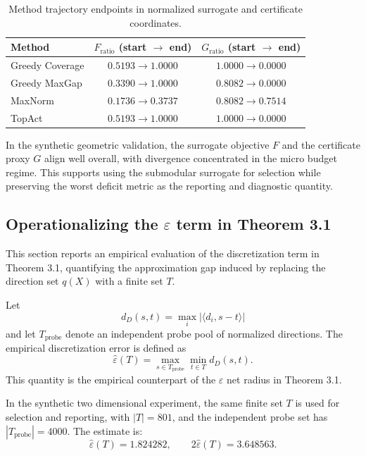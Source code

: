 \documentclass[accepted]{uai2026}
\theoremstyle{plain}
\theoremstyle{definition}
\theoremstyle{remark}
\begin{document}
\begin{table}[!h]
\centering
\caption{Method trajectory endpoints in normalized surrogate and certificate coordinates.}
\label{tab:surrogate_certificate_method_paths}
\small
\begin{tabular}{l c c}
\hline
Method & $F_{\mathrm{ratio}}$ (start $\to$ end) & $G_{\mathrm{ratio}}$ (start $\to$ end) \\
\hline
Greedy Coverage & $0.5193 \to 1.0000$ & $1.0000 \to 0.0000$ \\
Greedy MaxGap & $0.3390 \to 1.0000$ & $0.8082 \to 0.0000$ \\
MaxNorm & $0.1736 \to 0.3737$ & $0.8082 \to 0.7514$ \\
TopAct & $0.5193 \to 1.0000$ & $1.0000 \to 0.0000$ \\
\hline
\end{tabular}
\end{table}

In the synthetic geometric validation, the surrogate objective $F$ and the certificate proxy $G$ align well overall, with divergence concentrated in the micro budget regime. This supports using the submodular surrogate for selection while preserving the worst deficit metric as the reporting and diagnostic quantity.

\subsection{Operationalizing the \texorpdfstring{$\varepsilon$}{epsilon} term in Theorem 3.1}
\label{app:epsilon_practicality}

This section reports an empirical evaluation of the discretization term in Theorem 3.1, quantifying the approximation gap induced by replacing the direction set $q(X)$ with a finite set $T$.

Let
$$ d_D(s,t) = \max_i \left| \langle d_i, s-t \rangle \right| $$
and let $T_{\mathrm{probe}}$ denote an independent probe pool of normalized directions. The empirical discretization error is defined as
$$ \widehat{\varepsilon}(T) = \max_{s \in T_{\mathrm{probe}}} \min_{t \in T} d_D(s,t). $$
This quantity is the empirical counterpart of the $\varepsilon$ net radius in Theorem 3.1.

In the synthetic two dimensional experiment, the same finite set $T$ is used for selection and reporting, with $|T| = 801$, and the independent probe set has $|T_{\mathrm{probe}}| = 4000$. The estimate is:
$$ \widehat{\varepsilon}(T) = 1.824282, \qquad 2\widehat{\varepsilon}(T) = 3.648563. $$
\end{document}
